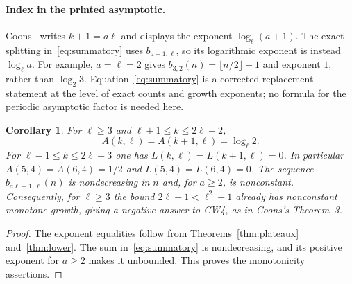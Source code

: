 \documentclass[11pt]{article}
\newtheorem{corollary}[theorem]{Corollary}
\begin{document}
\paragraph{Index in the printed asymptotic.}
Coons~\cite[Theorem~4]{Coons} writes $k+1=a\ell$ and displays
the exponent $\log_\ell(a+1)$.
The exact splitting in~\eqref{eq:summatory} uses $b_{a-1,\ell}$,
so its logarithmic exponent is instead $\log_\ell a$.
For example, $a=\ell=2$ gives $b_{3,2}(n)=\lfloor n/2\rfloor+1$
and exponent $1$, rather than $\log_2 3$.
Equation~\eqref{eq:summatory} is a corrected replacement statement
at the level of exact counts and growth exponents; no formula for
the periodic asymptotic factor is needed here.

\begin{corollary}\label{cor:consequences}
For $\ell\ge3$ and $\ell+1\le k\le2\ell-2$,
\[
 A(k,\ell)=A(k+1,\ell)=\log_\ell2.
\]
For $\ell-1\le k\le2\ell-3$ one has
$L(k,\ell)=L(k+1,\ell)=0$.
In particular $A(5,4)=A(6,4)=1/2$ and $L(5,4)=L(6,4)=0$.
The sequence $b_{a\ell-1,\ell}(n)$ is nondecreasing in $n$ and,
for $a\ge2$, is nonconstant. Consequently, for $\ell\ge3$ the
bound $2\ell-1<\ell^2-1$ already has nonconstant monotone growth,
giving a negative answer to CW4, as in Coons's Theorem~3.
\end{corollary}
\begin{proof}
The exponent equalities follow from Theorems~\ref{thm:plateaux}
and~\ref{thm:lower}. The sum in~\eqref{eq:summatory} is
nondecreasing, and its positive exponent for $a\ge2$ makes it
unbounded. This proves the monotonicity assertions.
\end{proof}
\end{document}
